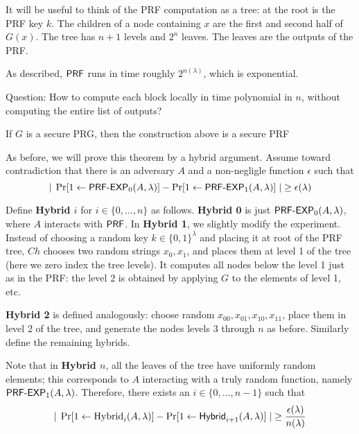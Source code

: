 It will be useful to think of the PRF computation as a tree: at the root is the PRF key $k$.  The children of a node containing $x$ are the first and second half of $G(x)$.  The tree has $n+1$ levels and $2^n$ leaves.  The leaves are the outputs of the PRF.

As described, ${\sf PRF}$ runs in time roughly $2^{n(\lambda)}$, which is exponential.

\begin{center}
Question: How to compute each block locally in time polynomial in $n$, without computing the entire list of outputs?
\end{center}

\begin{theorem}If $G$ is a secure PRG, then the construction above is a secure PRF\end{theorem}

As before, we will prove this theorem by a hybrid argument.  Assume toward contradiction that there is an adversary $A$ and a non-negligle function $\epsilon$ such that 
\[|\;\Pr[1\gets\text{\sf PRF-EXP}_0(A,\lambda)]-\Pr[1\gets\text{\sf PRF-EXP}_1(A,\lambda)]\;|\geq \epsilon(\lambda)\]

Define {\bf Hybrid $i$} for $i\in\{0,\dots,n\}$ as follows.  {\bf Hybrid 0} is just $\text{\sf PRF-EXP}_0(A,\lambda)$, where $A$ interacts with ${\sf PRF}$.  In {\bf Hybrid 1}, we slightly modify the experiment.  Instead of choosing a random key $k\in\{0,1\}^\lambda$ and placing it at root of the PRF tree, $Ch$ chooses two random strings $x_0,x_1$, and places them at level 1 of the tree (here we zero index the tree levels).  It computes all nodes below the level 1 just as in the PRF: the level 2 is obtained by applying $G$ to the elements of level 1, etc.  

{\bf Hybrid 2} is defined analogously: choose random $x_{00},x_{01},x_{10},x_{11}$, place them in level 2 of the tree, and generate the nodes levels 3 through $n$  as before.  Similarly define the remaining hybrids.

Note that in {\bf Hybrid $n$}, all the leaves of the tree have uniformly random elements; this corresponds to $A$ interacting with a truly random function, namely $\text{\sf PRF-EXP}_1(A,\lambda)$.  Therefore, there exists an $i\in\{0,\dots,n-1\}$ such that 
\[|\;\Pr[1\gets\text{Hybrid}_{i}(A,\lambda)]-\Pr[1\gets\text{\sf Hybrid}_{i+1}(A,\lambda)]\;|\geq \frac{\epsilon(\lambda)}{n(\lambda)}\]

